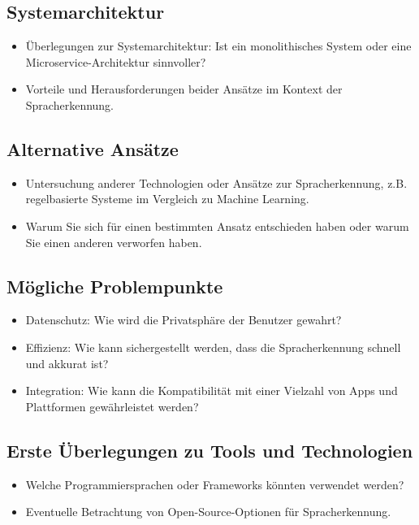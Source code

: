 \documentclass[11pt,a4paper]{article}
\begin{document}
\subsection{Systemarchitektur}
\begin{itemize}
    \item Überlegungen zur Systemarchitektur: Ist ein monolithisches System oder eine Microservice-Architektur sinnvoller?
    \item Vorteile und Herausforderungen beider Ansätze im Kontext der Spracherkennung.
\end{itemize}

\subsection{Alternative Ansätze}
\begin{itemize}
    \item Untersuchung anderer Technologien oder Ansätze zur Spracherkennung, z.B. regelbasierte Systeme im Vergleich zu Machine Learning.
    \item Warum Sie sich für einen bestimmten Ansatz entschieden haben oder warum Sie einen anderen verworfen haben.
\end{itemize}

\subsection{Mögliche Problempunkte}
\begin{itemize}
    \item Datenschutz: Wie wird die Privatsphäre der Benutzer gewahrt?
    \item Effizienz: Wie kann sichergestellt werden, dass die Spracherkennung schnell und akkurat ist?
    \item Integration: Wie kann die Kompatibilität mit einer Vielzahl von Apps und Plattformen gewährleistet werden?
\end{itemize}

\subsection{Erste Überlegungen zu Tools und Technologien}
\begin{itemize}
    \item Welche Programmiersprachen oder Frameworks könnten verwendet werden?
    \item Eventuelle Betrachtung von Open-Source-Optionen für Spracherkennung.
\end{itemize}
\end{document}
